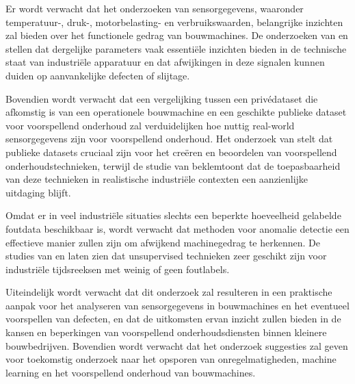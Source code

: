 Er wordt verwacht dat het onderzoeken van sensorgegevens, waaronder temperatuur-, druk-, motorbelasting- en verbruikswaarden, belangrijke inzichten zal bieden over het functionele gedrag van bouwmachines. De onderzoeken van \textcite{Nayak2024} en \textcite{Mahale2025} stellen dat dergelijke parameters vaak essentiële inzichten bieden in de technische staat van industriële apparatuur en dat afwijkingen in deze signalen kunnen duiden op aanvankelijke defecten of slijtage.

Bovendien wordt verwacht dat een vergelijking tussen een privédataset die afkomstig is van een operationele bouwmachine en een geschikte publieke dataset voor voorspellend onderhoud zal verduidelijken hoe nuttig real-world sensorgegevens zijn voor voorspellend onderhoud. Het onderzoek van \textcite{Veloso2022} stelt dat publieke datasets cruciaal zijn voor het creëren en beoordelen van voorspellend onderhoudstechnieken, terwijl de studie van \textcite{Elahi2023} beklemtoont dat de toepasbaarheid van deze technieken in realistische industriële contexten een aanzienlijke uitdaging blijft.

Omdat er in veel industriële situaties slechts een beperkte hoeveelheid gelabelde foutdata beschikbaar is, wordt verwacht dat methoden voor anomalie detectie een effectieve manier zullen zijn om afwijkend machinegedrag te herkennen. De studies van \textcite{Giannoulidis2024} en \textcite{Aggarwal2025} laten zien dat unsupervised technieken zeer geschikt zijn voor industriële tijdsreeksen met weinig of geen foutlabels.

Uiteindelijk wordt verwacht dat dit onderzoek zal resulteren in een praktische aanpak voor het analyseren van sensorgegevens in bouwmachines en het eventueel voorspellen van defecten, en dat de uitkomsten ervan inzicht zullen bieden in de kansen en beperkingen van voorspellend onderhoudsdiensten binnen kleinere bouwbedrijven. Bovendien wordt verwacht dat het onderzoek suggesties zal geven voor toekomstig onderzoek naar het opsporen van onregelmatigheden, machine learning en het voorspellend onderhoud van bouwmachines.



